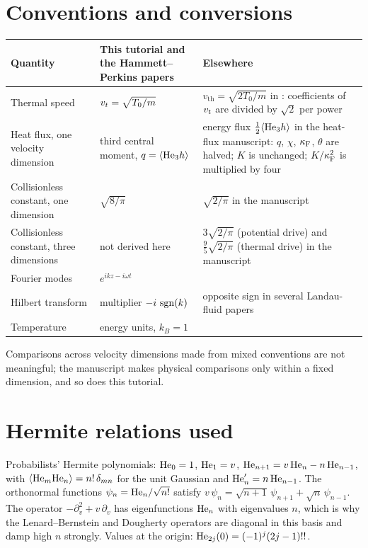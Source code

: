 \section{Conventions and conversions}
\label{app:conv}

\begin{center}
\renewcommand{\arraystretch}{1.3}
\begin{tabularx}{\textwidth}{@{}P{3.6cm}YY@{}}
\toprule
Quantity & This tutorial and the Hammett--Perkins papers
  & Elsewhere \\
\midrule
Thermal speed & $v_t=\sqrt{T_0/m}$
  & $v_{\mathrm{th}}=\sqrt{2T_0/m}$ in \cite{Hunana19}: coefficients of
    $v_t$ are divided by $\sqrt2$ per power \\
Heat flux, one velocity dimension & third central moment,
  $q=\langle \mathrm{He}_3h \rangle$
  & energy flux $\tfrac12\langle \mathrm{He}_3h \rangle$ in the heat-flux manuscript:
    $q$, $\chi$, $\kappa_{\mathrm F}$, $\theta$ are halved; $K$ is unchanged; $K/\kappa_{\mathrm F}^2$ is
    multiplied by four \\
Collisionless constant, one dimension & $\sqrt{8/\pi}$
  & $\sqrt{2/\pi}$ in the manuscript \\
Collisionless constant, three dimensions & not derived here
  & $3\sqrt{2/\pi}$ (potential drive) and $\tfrac95\sqrt{2/\pi}$ (thermal
    drive) in the manuscript \\
Fourier modes & $e^{ikz-i\omega t}$ & \\
Hilbert transform & multiplier $-i\,\operatorname{sgn}(k)$
  & opposite sign in several Landau-fluid papers \\
Temperature & energy units, $k_B=1$ & \\
\bottomrule
\end{tabularx}
\end{center}
Comparisons across velocity dimensions made from mixed conventions are not
meaningful; the manuscript makes physical comparisons only within a fixed
dimension, and so does this tutorial.

\section{Hermite relations used}
\label{app:hermite}

Probabilists' Hermite polynomials: $\mathrm{He}_0=1$, $\mathrm{He}_1=v$,
$\mathrm{He}_{n+1}=v\,\mathrm{He}_n-n\,\mathrm{He}_{n-1}$, with $\langle \mathrm{He}_m\mathrm{He}_n \rangle=n!\,\delta_{mn}$
for the unit Gaussian and $\mathrm{He}_n'=n\,\mathrm{He}_{n-1}$. The orthonormal functions
$\psi_n=\mathrm{He}_n/\sqrt{n!}$ satisfy
$v\,\psi_n=\sqrt{n+1}\,\psi_{n+1}+\sqrt n\,\psi_{n-1}$. The operator
$-\partial_v^2+v\,\partial_v$ has eigenfunctions $\mathrm{He}_n$ with eigenvalues
$n$, which is why the Lenard--Bernstein and Dougherty operators are
diagonal in this basis and damp high $n$ strongly. Values at the origin:
$\mathrm{He}_{2j}(0)=(-1)^j(2j-1)!!$.


